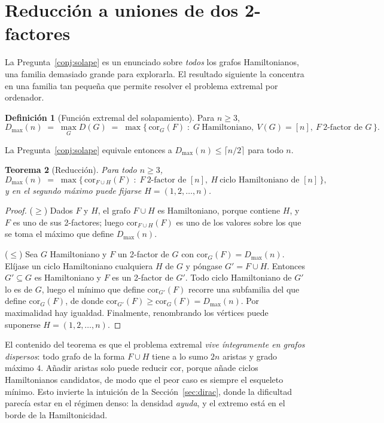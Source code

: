 \documentclass[11pt,a4paper]{article}
\newtheorem{teorema}{Teorema}[section]
\theoremstyle{definition}
\newtheorem{definicion}[teorema]{Definición}
\theoremstyle{remark}
\begin{document}
\section{Reducción a uniones de dos 2-factores}\label{sec:reduccion}

La Pregunta~\ref{conj:solape} es un enunciado sobre \emph{todos} los grafos Hamiltonianos, una familia demasiado grande para explorarla. El resultado siguiente la concentra en una familia tan pequeña que permite resolver el problema extremal por ordenador.

\begin{definicion}[Función extremal del solapamiento]
Para $n\ge3$,
\[
D_{\max}(n)\;=\;\max_G D(G)\;=\;\max\bigl\{\,\mathrm{cor}_G(F)\;:\;G\ \text{Hamiltoniano},\ V(G)=[n],\ F\ \text{2-factor de }G\,\bigr\}.
\]
\end{definicion}

La Pregunta~\ref{conj:solape} equivale entonces a $D_{\max}(n)\le\lceil n/2\rceil$ para todo $n$.

\begin{teorema}[Reducción]\label{thm:reduccion}
Para todo $n\ge3$,
\[
D_{\max}(n)\;=\;\max\bigl\{\,\mathrm{cor}_{F\cup H}(F)\;:\;F\ \text{2-factor de }[n],\
H\ \text{ciclo Hamiltoniano de }[n]\,\bigr\},
\]
y en el segundo máximo puede fijarse $H=(1,2,\dots,n)$.
\end{teorema}

\begin{proof}
($\ge$) Dados $F$ y $H$, el grafo $F\cup H$ es Hamiltoniano, porque contiene $H$, y $F$ es uno de sus 2-factores; luego $\mathrm{cor}_{F\cup H}(F)$ es uno de los valores sobre los que se toma el máximo que define $D_{\max}(n)$.

($\le$) Sea $G$ Hamiltoniano y $F$ un 2-factor de $G$ con $\mathrm{cor}_G(F)=D_{\max}(n)$. Elíjase un ciclo Hamiltoniano cualquiera $H$ de $G$ y póngase $G'=F\cup H$. Entonces $G'\subseteq G$ es Hamiltoniano y $F$ es un 2-factor de $G'$. Todo ciclo Hamiltoniano de $G'$ lo es de $G$, luego el mínimo que define $\mathrm{cor}_{G'}(F)$ recorre una subfamilia del que define $\mathrm{cor}_G(F)$, de donde $\mathrm{cor}_{G'}(F)\ge\mathrm{cor}_G(F)=D_{\max}(n)$. Por maximalidad hay igualdad. Finalmente, renombrando los vértices puede suponerse $H=(1,2,\dots,n)$.
\end{proof}

El contenido del teorema es que el problema extremal \emph{vive íntegramente en grafos dispersos}: todo grafo de la forma $F\cup H$ tiene a lo sumo $2n$ aristas y grado máximo $4$. Añadir aristas solo puede reducir $\mathrm{cor}$, porque añade ciclos Hamiltonianos candidatos, de modo que el peor caso es siempre el esqueleto mínimo. Esto invierte la intuición de la Sección~\ref{sec:dirac}, donde la dificultad parecía estar en el régimen denso: la densidad \emph{ayuda}, y el extremo está en el borde de la Hamiltonicidad.
\end{document}
